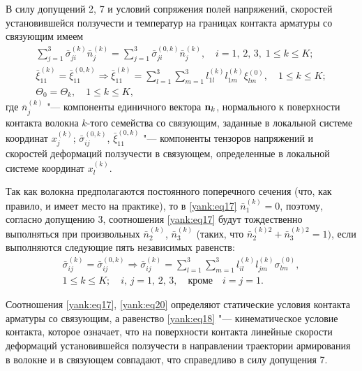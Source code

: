 В силу допущений 2, 7 и условий сопряжения полей напряжений, скоростей
установившейся ползучести и температур на границах контакта арматуры со
связующим имеем
\begin{gather}
\label{yank:eq17}
\sum\limits_{j=1}^3 \bar {\sigma }_{ji}^{(k)}
\bar {n}_j^{(k)} =\sum\limits_{j=1}^3 \bar {\sigma
}_{ji}^{(0,k)} \bar {n}_j^{(k)}, \quad i=1,\,2,\,3,\; 1\le k\le K;\\
\label{yank:eq18}
\bar {\xi }_{11}^{(k)} =\bar {\xi }_{11}^{(0,k)} \Rightarrow \bar {\xi }_{11}^{(k)}
=\sum\limits_{l=1}^3 \sum\limits_{m=1}^3 l_{1l}^{(k)}
l_{1m}^{(k)} \xi _{lm}^{(0)},\quad 1\le k\le K;\\
\label{yank:eq19}
\Theta _0 =\Theta _k, \quad 1\le k\le K,
\end{gather}
где $\bar {n}_j^{(k)} $ "--- компоненты единичного вектора ${\rm {\bf n}}_k $,
нормального к поверхности контакта волокна $k$-того семейства со связующим,
заданные в локальной системе координат $x_j^{(k)}$; $\bar {\sigma
}_{ij}^{(0,k)} $, $\bar {\xi }_{11}^{(0,k)} $ "--- компоненты тензоров
напряжений и скоростей деформаций ползучести в связующем, определенные в
локальной системе координат $x_l^{(k)}$.

Так как волокна предполагаются постоянного поперечного сечения (что, как
правило, и имеет место на практике), то в \eqref{yank:eq17} $\bar {n}_1^{(k)} =0$,
поэтому, согласно допущению 3, соотношения \eqref{yank:eq17} будут тождественно
выполняться при произвольных $\bar {n}_2^{(k)}$, $\bar {n}_3^{(k)}$
(таких, что $\bar {n}_2^{(k)2}+\bar {n}_3^{(k)2}=1)$, если выполняются
следующие пять независимых равенств:
\begin{equation}
\label{yank:eq20}
\begin{array}{c}
\displaystyle 
\bar {\sigma }_{ij}^{(k)} =\bar {\sigma }_{ij}^{(0,k)}
\Rightarrow \bar {\sigma }_{ij}^{(k)}=\sum\limits_{l=1}^3 \sum\limits_{m=1}^3 l_{il}^{(k)} l_{jm}^{(k)} \sigma
_{lm}^{(0)},  \\
1\le k\le K;\quad i,\,j=1,\,2,\,3,\quad \text{кроме}\quad i=j=1.
 \end{array}
\end{equation}

Соотношения \eqref{yank:eq17}, \eqref{yank:eq20} определяют статические условия контакта арматуры со
связующим, а равенство \eqref{yank:eq18} "--- кинематическое условие контакта, которое
означает, что на поверхности контакта линейные скорости деформаций
установившейся ползучести в направлении траектории армирования в волокне и в
связующем совпадают, что справедливо в силу допущения 7.


